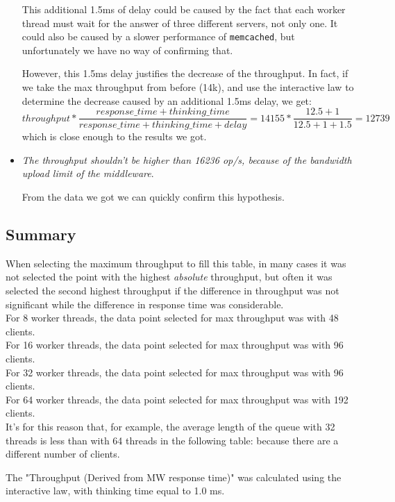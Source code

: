 \documentclass[11pt,a4paper]{article}
\renewcommand{\t}[1]{%
	{\texttt{#1}}}
\begin{document}
\begin{itemize}
		This additional 1.5ms of delay could be caused by the fact that each
		worker thread must wait for the answer of three different servers, not only
		one. It could also be caused by a slower performance of \t{memcached}, 
		but unfortunately we have no way of confirming that.

		However, this 1.5ms delay justifies the decrease of the throughput.
		In fact, if we take the max throughput from before (14k), and use the
		interactive law to determine the decrease caused by an additional 1.5ms
		delay, we get:
		$$
		throughput * \frac{response\_time + thinking\_time}{response\_time + thinking\_time + delay} = 14155 * \frac{12.5 + 1}{12.5 + 1 + 1.5} = 12739
		$$
		which is close enough to the results we got.

	\item \emph{The throughput shouldn't be higher than 16236 op/s, because of the
		bandwidth upload limit of the middleware}.

		From the data we got we can quickly confirm this hypothesis.

\end{itemize}

\subsection{Summary}

When selecting the maximum throughput to fill this table, in many cases it was not selected
the point with the highest \emph{absolute} throughput, but often it was selected the 
second highest throughput if the difference in throughput was not significant while the
difference in response time was considerable.\\
For 8 worker threads,  the data point selected for max throughput was with 48 clients.\\
For 16 worker threads, the data point selected for max throughput was with 96 clients.\\
For 32 worker threads, the data point selected for max throughput was with 96 clients.\\
For 64 worker threads, the data point selected for max throughput was with 192 clients.\\

It's for this reason that, for example, the average length of the queue with 32 threads
is less than with 64 threads in the following table: because there are a different number
of clients.

The "Throughput (Derived from MW response time)" was calculated using the interactive law,
with thinking time equal to 1.0 ms.
\end{document}
